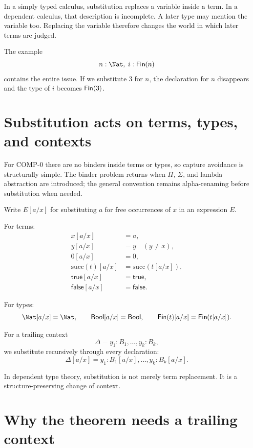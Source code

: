 \documentclass[11pt,openany]{book}
\begin{document}
In a simply typed calculus, substitution replaces a variable inside a term. In a dependent calculus, that description is incomplete. A later type may mention the variable too. Replacing the variable therefore changes the world in which later terms are judged.

The example
\[
  n:\Nat,\; i:\Fin(n)
\]
contains the entire issue. If we substitute $3$ for $n$, the declaration for $n$ disappears and the type of $i$ becomes $\mathsf{Fin}(3)$.



\section{Substitution acts on terms, types, and contexts}

For COMP-0 there are no binders inside terms or types, so capture avoidance is structurally simple. The binder problem returns when $\Pi$, $\Sigma$, and lambda abstraction are introduced; the general convention remains alpha-renaming before substitution when needed.

Write $E[a/x]$ for substituting $a$ for free occurrences of $x$ in an expression $E$.

For terms:
\[
\begin{aligned}
  x[a/x] &= a,\\
  y[a/x] &= y \quad(y\neq x),\\
  0[a/x] &= 0,\\
  \mathrm{succ}(t)[a/x] &= \mathrm{succ}(t[a/x]),\\
  \mathsf{true}[a/x] &= \mathsf{true},\\
  \mathsf{false}[a/x] &= \mathsf{false}.
\end{aligned}
\]

For types:
\[
  \Nat[a/x]=\Nat,
  \qquad \mathsf{Bool}[a/x]=\mathsf{Bool},
  \qquad \Fin(t)[a/x]=\Fin(t[a/x]).
\]

For a trailing context
\[
  \Delta = y_1:B_1,\ldots,y_k:B_k,
\]
we substitute recursively through every declaration:
\[
  \Delta[a/x]
  = y_1:B_1[a/x],\ldots,y_k:B_k[a/x].
\]

\begin{principle}
In dependent type theory, substitution is not merely term replacement. It is a structure-preserving change of context.
\end{principle}

\section{Why the theorem needs a trailing context}
\end{document}
